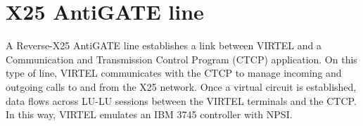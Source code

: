 \documentclass[letterpaper,10pt,english]{sphinxmanual}
\begin{document}
\begin{sphinxVerbatim}[commandchars=\\\{\}]
                     
                                     
                
                                      
                                       
                                       
                                         
    
\end{sphinxVerbatim}


\newpage


\section{X25 AntiGATE line}
\label{\detokenize{connectivity_guide:index-74}}\label{\detokenize{connectivity_guide:x25-antigate-line}}
A Reverse-X25 AntiGATE line establishes a link between VIRTEL and a Communication and Transmission Control Program (CTCP) application. On this type of line, VIRTEL communicates with the CTCP to manage incoming and outgoing calls to and from the X25 network. Once a virtual circuit is established, data flows across LU-LU sessions between the VIRTEL terminals and the CTCP. In this way, VIRTEL emulates an IBM 3745 controller with NPSI.


\end{document}
